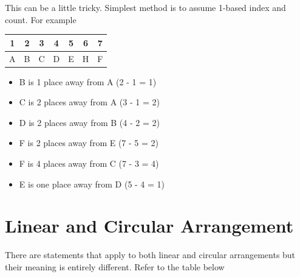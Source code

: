 This can be a little tricky. Simplest method is to assume 1-based index and count. For example


\begin{table}[h!]
    \centering
    \begin{tabular}{| c | c | c | c | c | c | c |}
        \hline
        1 & 2 & 3 & 4 & 5 & 6 & 7 \\
        \hline
        A & B & C & D & E & H & F \\
        \hline
    \end{tabular}
\end{table}


\begin{multicols}{2}
    \begin{itemize}
        \item B is 1 place away from A (2 - 1 = 1)
        \item C is 2 places away from A (3 - 1 = 2)
        \item D is 2 places away from B (4 - 2 = 2)
    \end{itemize}

    \columnbreak

    \begin{itemize}
        \item F is 2 places away from E (7 - 5 = 2)
        \item F is 4 places away from C (7 - 3 = 4)
        \item E is one place away from D (5 - 4 = 1)
    \end{itemize}
    
\end{multicols}

\newpage
\section{Linear and Circular Arrangement}

There are statements that apply to both linear and circular arrangements but their meaning is entirely different. Refer to the table below

